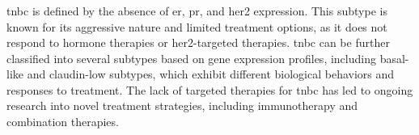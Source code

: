 \subsubsection{}
\Gls{tnbc} is defined by the absence of \gls{er}, \gls{pr},
and \gls{her2} expression.
This subtype is known for its aggressive nature and limited treatment options,
as it does not respond to hormone therapies or \gls{her2}-targeted
therapies\supercite{sizemore_triple_2021}.
\Gls{tnbc} can be further classified into several subtypes based on gene
expression
profiles, including basal-like and claudin-low subtypes, which exhibit
different biological behaviors and responses to
treatment\supercite{lehmann_identification_2011}.
The lack of targeted therapies for \gls{tnbc} has led to ongoing research into
novel treatment strategies, including immunotherapy and combination
therapies\supercite{lehmann_identification_2011}.

